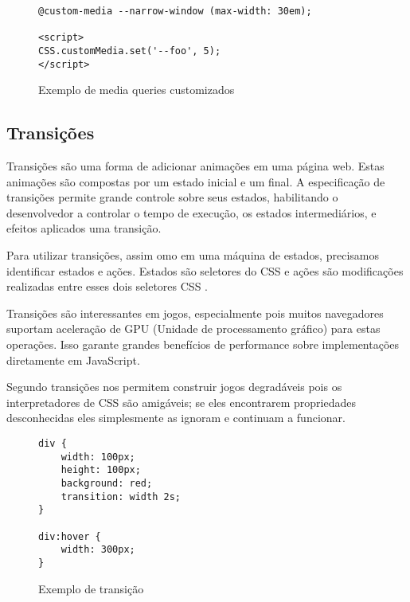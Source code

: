 \begin{figure}[H]
\centering
\begin{verbatim}
@custom-media --narrow-window (max-width: 30em);

<script>
CSS.customMedia.set('--foo', 5);
</script>

\end{verbatim}
\caption{Exemplo de media queries customizados}
\label{fig:MediaQueryCustom}
\end{figure}


\subsection{Transições}

Transições são uma forma de adicionar animações em uma página
web. Estas animações são compostas por um estado inicial e um final.
A especificação de transições permite grande controle sobre seus
estados, habilitando o desenvolvedor a controlar o tempo de execução,
os estados intermediários, e efeitos aplicados uma transição.

Para utilizar transições, assim omo em uma máquina de estados,
precisamos identificar estados e ações. Estados são seletores do CSS
e ações são modificações realizadas entre esses dois seletores CSS
\autocite{html5mostwanted}.

Transições são interessantes em jogos, especialmente pois muitos
navegadores suportam aceleração de GPU (Unidade de processamento
gráfico) para estas operações. Isso garante grandes benefícios de
performance sobre implementações diretamente em JavaScript.

Segundo \cite{html5mostwanted} transições nos permitem construir jogos
degradáveis pois os interpretadores de CSS são amigáveis; se eles
encontrarem propriedades desconhecidas eles simplesmente as ignoram e
continuam a funcionar.

\begin{figure}[H]
\centering
\begin{verbatim}
div {
    width: 100px;
    height: 100px;
    background: red;
    transition: width 2s;
}

div:hover {
    width: 300px;
}

\end{verbatim}
\caption{Exemplo de transição}
\label{fig:CSSTransition}
\end{figure}

